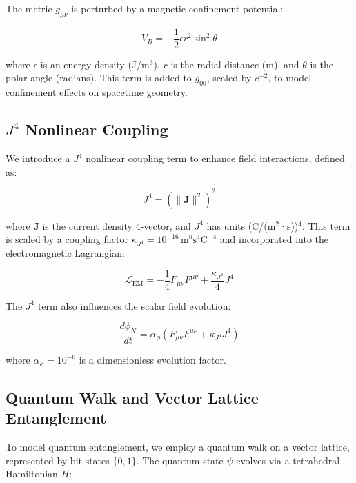 \documentclass[12pt]{article}
\begin{document}
The metric \( g_{\mu \nu} \) is perturbed by a magnetic confinement potential:

\begin{equation}
V_B = -\frac{1}{2} \epsilon r^2 \sin^2 \theta
\label{eq:magnetic_potential}
\end{equation}

where \( \epsilon \) is an energy density (J/m\(^3\)), \( r \) is the radial distance (m), and \( \theta \) is the polar angle (radians). This term is added to \( g_{00} \), scaled by \( c^{-2} \), to model confinement effects on spacetime geometry.

\subsection{\( J^4 \) Nonlinear Coupling}

We introduce a \( J^4 \) nonlinear coupling term to enhance field interactions, defined as:

\begin{equation}
J^4 = \left( \|\mathbf{J}\|^2 \right)^2
\label{eq:j4_term}
\end{equation}

where \( \mathbf{J} \) is the current density 4-vector, and \( J^4 \) has units (C/(m\(^2\)·s))\(^4\). This term is scaled by a coupling factor \( \kappa_{J^4} = 10^{-16} \, \text{m}^8 \text{s}^4 \text{C}^{-4} \) and incorporated into the electromagnetic Lagrangian:

\begin{equation}
\mathcal{L}_{\text{EM}} = -\frac{1}{4} F_{\mu \nu} F^{\mu \nu} + \frac{\kappa_{J^4}}{4} J^4
\label{eq:em_lagrangian}
\end{equation}

The \( J^4 \) term also influences the scalar field evolution:

\begin{equation}
\frac{d \phi_N}{dt} = \alpha_{\phi} \left( F_{\mu \nu} F^{\mu \nu} + \kappa_{J^4} J^4 \right)
\label{eq:phi_evolution}
\end{equation}

where \( \alpha_{\phi} = 10^{-6} \) is a dimensionless evolution factor.

\subsection{Quantum Walk and Vector Lattice Entanglement}

To model quantum entanglement, we employ a quantum walk on a vector lattice, represented by bit states \( \{0, 1\} \). The quantum state \( \psi \) evolves via a tetrahedral Hamiltonian \( H \):
\end{document}
